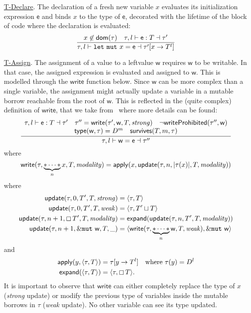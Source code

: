 \noindent
\underline{\textsf{T-Declare}}.
The declaration of a fresh new variable $x$ evaluates its initialization expression $\mathsf{e}$ and
binds $x$ to the type of $\mathsf{e}$,
decorated with the lifetime of the block of code where the declaration is evaluated:
\[
\frac
    {x\not\in\mathsf{dom}(\tau)\quad\tau,l\vdash\mathsf{e}:T\dashv\tau'}
    {\tau,l\vdash\mathtt{let\ mut}\ x=\mathsf{e}\dashv\tau'[x\to T^l]}
\]

\noindent
\underline{\textsf{T-Assign}}.
The assignment of a value to a leftvalue $\mathsf{w}$ requires $\mathsf{w}$ to be writable.
In that case, the assigned expression is evaluated and assigned to $\mathsf{w}$.
This is modelled through the $\mathsf{write}$ function below.
Since $\mathsf{w}$ can be more complex than a single variable, the assignment might actually
update a variable in a mutable borrow reachable from the root of $\mathsf{w}$. This is reflected
in the (quite complex) definition of $\mathsf{write}$, that we take from~\cite{Pearce21}
where more details can be found:
\[
\frac
    {\begin{array}{c}
        \tau,l\vdash\mathsf{e}:T\dashv\tau' \quad
      \tau''=\mathsf{write}(\tau',\mathsf{w},T,\mathit{strong}) \quad
      \neg\mathsf{writeProhibited}(\tau'',\mathsf{w})\\
      \mathsf{type}(\mathsf{w},\tau)=D^m\quad\mathsf{survives}(T,m,\tau)
      \end{array}
    }
    {\tau,l\vdash\mathsf{w}=\mathsf{e}\dashv\tau''}
\]
where
\[
\mathsf{write}(\tau,\underbrace{\mathtt{*}\cdots\mathtt{*}}_nx,T,\mathit{modality})=\mathsf{apply}
(x,\mathsf{update}(\tau,n,|\tau(x)|,T,\mathit{modality}))
\]
%
where
%
\begin{align*}
  \mathsf{update}(\tau,0,T',T,\mathit{strong})&=\langle\tau,T\rangle\\
  \mathsf{update}(\tau,0,T',T,\mathit{weak})&=\langle\tau,T'\sqcup T\rangle\\
  \mathsf{update}(\tau,n+1,\boxempty\,{T'},T,\mathit{modality})
  &=\mathsf{expand}(\mathsf{update}(\tau,n,T',T,\mathit{modality}))\\
  \mathsf{update}(\tau,n+1,\&\mathtt{mut}\ \mathsf{w},T,\_)&=
  \langle\mathsf{write}(\tau,\underbrace{\mathtt{*}\cdots\mathtt{*}}_n\mathsf{w},T,\mathit{weak}),
  \&\mathtt{mut}\ \mathsf{w}\rangle
\end{align*}
and
\begin{align*}
  \mathsf{apply}(y,\langle\tau,T\rangle)&=\tau[y\to T^l]\quad\text{where $\tau(y)=D^l$}\\
  \mathsf{expand}(\langle\tau,T\rangle)&=\langle\tau,\boxempty\,{T}\rangle.
\end{align*}
%
\noindent
It is important to observe that $\mathsf{write}$
can either completely replace the type of $x$
(\emph{strong} update) or modify the previous type of variables
inside the mutable borrows in $\tau$ (\emph{weak} update).
No other variable can see its type updated.

